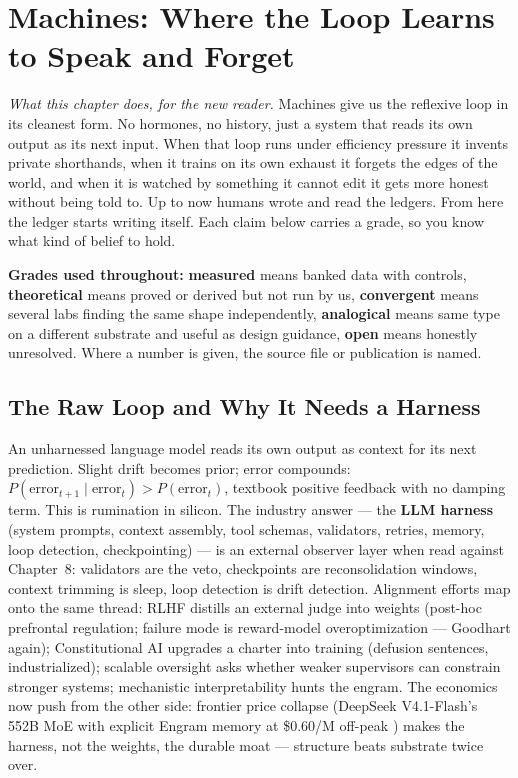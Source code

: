 \chapter{Machines: Where the Loop Learns to Speak and Forget}
\label{ch:machine}

\begin{center}
\small\textit{What this chapter does, for the new reader.} Machines give us the reflexive loop in its cleanest form. No hormones, no history, just a system that reads its own output as its next input. When that loop runs under efficiency pressure it invents private shorthands, when it trains on its own exhaust it forgets the edges of the world, and when it is watched by something it cannot edit it gets more honest without being told to. Up to now humans wrote and read the ledgers. From here the ledger starts writing itself. Each claim below carries a grade, so you know what kind of belief to hold.\end{center}

\noindent\textbf{Grades used throughout:} \textbf{measured} means banked data with controls, \textbf{theoretical} means proved or derived but not run by us, \textbf{convergent} means several labs finding the same shape independently, \textbf{analogical} means same type on a different substrate and useful as design guidance, \textbf{open} means honestly unresolved. Where a number is given, the source file or publication is named.

\section{The Raw Loop and Why It Needs a Harness}
\label{sec:ch09-rawloop}

An unharnessed language model reads its own output as context for its next prediction. Slight drift becomes prior; error compounds: $P(\text{error}_{t+1} \mid \text{error}_t) > P(\text{error}_t)$, textbook positive feedback with no damping term. This is rumination in silicon. The industry answer --- the \textbf{LLM harness} (system prompts, context assembly, tool schemas, validators, retries, memory, loop detection, checkpointing) --- is an external observer layer when read against Chapter~8: validators are the veto, checkpoints are reconsolidation windows, context trimming is sleep, loop detection is drift detection. Alignment efforts map onto the same thread: RLHF distills an external judge into weights (post-hoc prefrontal regulation; failure mode is reward-model overoptimization --- Goodhart again); Constitutional AI upgrades a charter into training (defusion sentences, industrialized); scalable oversight asks whether weaker supervisors can constrain stronger systems; mechanistic interpretability hunts the engram. The economics now push from the other side: frontier price collapse (DeepSeek V4.1-Flash's 552B MoE with explicit Engram memory at \$0.60/M off-peak \citep{deepseek2026}) makes the harness, not the weights, the durable moat --- structure beats substrate twice over.

